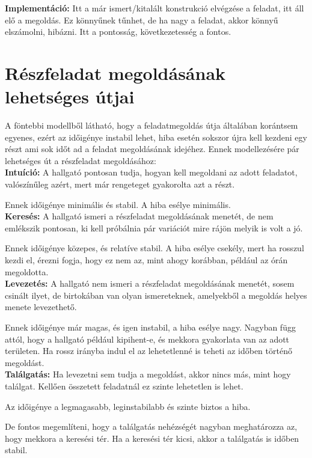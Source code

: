 \documentclass[12pt]{report}
\theoremstyle{definition}
\begin{document}
\textbf{Implementáció:} Itt a már ismert/kitalált konstrukció elvégzése a feladat, itt áll elő a megoldás. Ez könnyűnek tűnhet, de ha nagy a feladat, akkor könnyű elszámolni, hibázni. Itt a pontosság, következetesség a fontos.

\section{Részfeladat megoldásának lehetséges útjai}
A föntebbi modellből látható, hogy a feladatmegoldás útja általában korántsem egyenes, ezért az időigénye instabil lehet, hiba esetén sokszor újra kell kezdeni egy részt ami sok időt ad a feladat megoldásának idejéhez. Ennek modellezésére pár lehetséges út a részfeladat megoldásához:\\

\textbf{Intuíció:} A hallgató pontosan tudja, hogyan kell megoldani az adott feladatot, valószínűleg azért, mert már rengeteget gyakorolta azt a részt.

Ennek időigénye minimális és stabil. A hiba esélye minimális.\\

\textbf{Keresés:} A hallgató ismeri a részfeladat megoldásának menetét, de nem emlékszik pontosan, ki kell próbálnia pár variációt mire rájön melyik is volt a jó.

Ennek időigénye közepes, és relatíve stabil. A hiba esélye csekély, mert ha rosszul kezdi el, érezni fogja, hogy ez nem az, mint ahogy korábban, például az órán megoldotta.\\

\textbf{Levezetés:} A hallgató nem ismeri a részfeladat megoldásának menetét, sosem csinált ilyet, de birtokában van olyan ismereteknek, amelyekből a megoldás helyes menete levezethető.

Ennek időigénye már magas, és igen instabil, a hiba esélye nagy. Nagyban függ attól, hogy a hallgató például kipihent-e, és mekkora gyakorlata van az adott területen. Ha rossz irányba indul el az lehetetlenné is teheti az időben történő megoldást.\\

\textbf{Találgatás:} Ha levezetni sem tudja a megoldást, akkor nincs más, mint hogy találgat. Kellően összetett feladatnál ez szinte lehetetlen is lehet.

Az időigénye a legmagasabb, leginstabilabb és szinte biztos a hiba.

De fontos megemlíteni, hogy a találgatás nehézségét nagyban meghatározza az, hogy mekkora a keresési tér. Ha a keresési tér kicsi, akkor a találgatás is időben stabil.
\end{document}
